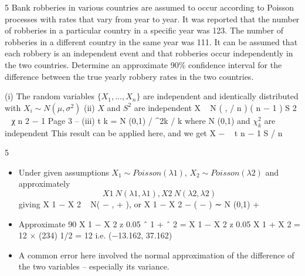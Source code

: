 \documentclass[a4paper,12pt]{article}
\begin{document}

\item 5
Bank robberies in various countries are assumed to occur according to Poisson
processes with rates that vary from year to year. It was reported that the number of robberies in a particular country in a specific year was 123. The number of robberies
in a different country in the same year was 111. It can be assumed that each robbery is an independent event and that robberies occur independently in the two countries.
Determine an approximate 90\% confidence interval for the difference between the true yearly robbery rates in the two countries.

(i)
The random variables $\{ X_1 , \ldots, X_n\}$  are independent
and identically distributed with $X_i \sim N ( \mu , \sigma^2 )$
(ii)
$X$ and $S^2$ are independent
X ~ N ( \mu ,  / n )
( n − 1 ) S 2
~ χ n 2 − 1
Page 3 – 
(iii)
t k = N (0,1) / \chi^2k / k where N (0,1) and $\chi^2_k$ are independent
This result can be applied here, and we get
X −\mu
~ t n − 1
S / n

5
\begin{itemize}
\item Under given assumptions $X_1 \sim Poisson(\lambda 1 )$, $X_2 \sim Poisson(\lambda 2 )$ and approximately
\[X 1 ~ N(\lambda 1 , \lambda 1 ), X 2 ~ N(\lambda 2 , \lambda 2 )\]
giving X 1 − X 2 ~ N( −  ,  +  ), or
X 1 − X 2 − (  −  )
∼ N (0,1)
 + 
\item Approximate 90%
X 1 − X 2 \pm z 0.05 \lambda ˆ 1 + \lambda ˆ 2 = X 1 − X 2 \pm z 0.05 X 1 + X 2
= 12  × (234) 1/2 = 12  i.e. (−13.162, 37.162)

\item A common error here involved the normal approximation of the difference of the two variables – especially its variance.
\end{itemize}
\end{document}
